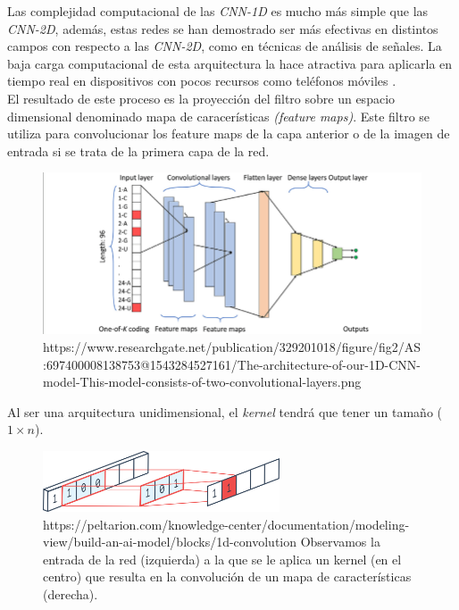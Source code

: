                     Las complejidad computacional de las \textit{CNN-1D} es mucho más simple que las \textit{CNN-2D}, además, estas redes se han demostrado ser más efectivas en distintos campos con respecto a las \textit{CNN-2D}, como en técnicas de análisis de señales. La baja carga computacional de esta arquitectura la hace atractiva para aplicarla en tiempo real en dispositivos con pocos recursos como teléfonos móviles \cite{Conv1D_Survey}.\\


                    El resultado de este proceso es la proyección del filtro sobre un espacio dimensional denominado mapa de caracerísticas \textit{(feature maps)}. Este filtro se utiliza para convolucionar los feature maps de la capa anterior \cite{FiltersFeatureMaps} o de la imagen de entrada si se trata de la primera capa de la red.
                    

                    \begin{figure}[h]
                        \centering
                        \includegraphics[width=15cm]{archivos/3.Tecnologias/RedesNeuronales/CNN/1D/1CNNArchImage}
                        \caption{https://www.researchgate.net/publication/329201018/figure/fig2/AS:697400008138753@1543284527161/The-architecture-of-our-1D-CNN-model-This-model-consists-of-two-convolutional-layers.png}
                        \label{1CNNArchImage}
                    \end{figure}


                    Al ser una arquitectura unidimensional, el \textit{kernel} tendrá que tener un tamaño ($1 \times n$).

                    \begin{figure}[h]
                        \centering
                        \includegraphics[width=7cm]{archivos/3.Tecnologias/RedesNeuronales/CNN/1D/1DConvolution}
                        \caption{https://peltarion.com/knowledge-center/documentation/modeling-view/build-an-ai-model/blocks/1d-convolution Observamos la entrada de la red (izquierda) a la que se le aplica un kernel (en el centro) que resulta en la convolución de un mapa de características (derecha).}
                        \label{1DConvolutionImage}
                    \end{figure}

